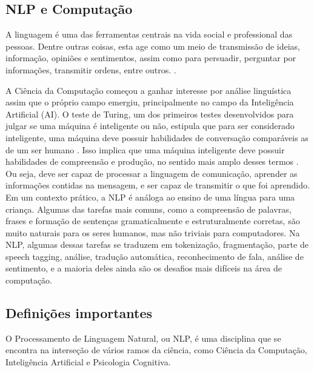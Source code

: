 \documentclass[
	12pt,				%
	openright,			%
	oneside,			%
	a4paper,			%
	english,			%
	spanish,			%
	brazil				%
	]{abntex2}
\begin{document}
		\subsection*{NLP e Computação}
		A linguagem é uma das ferramentas centrais na vida social e professional das pessoas. Dentre outras coisas, esta age como um meio de transmissão de ideias, informação, opiniões e sentimentos, assim como para persuadir, perguntar por informações, transmitir ordens, entre outros. \cite{book_natural_lang}.
		
A Ciência da Computação começou a ganhar interesse por análise linguística assim que o próprio campo emergiu, principalmente no campo da Inteligência Artificial (AI). O teste de Turing, um dos primeiros testes desenvolvidos para julgar se uma máquina é inteligente ou não, estipula que para ser considerado inteligente, uma máquina deve possuir habilidades de conversação comparáveis as de um ser humano \cite{turing}.  Isso implica que uma máquina inteligente deve possuir habilidades de compreensão e produção, no sentido mais amplo desses termos \cite{book_natural_lang}. Ou seja, deve ser capaz de processar a linguagem de comunicação, aprender as informações contidas na mensagem, e ser capaz de transmitir o que foi aprendido. 	
Em um contexto prático, a NLP é análoga ao ensino de uma língua para uma criança. Algumas das tarefas mais comuns, como a compreensão de palavras, frases e formação de sentenças gramaticalmente e estruturalmente corretas, são muito naturais para os seres humanos, mas não triviais para computadores. Na NLP, algumas dessas tarefas se traduzem em tokenização, fragmentação, parte de speech tagging, análise, tradução automática, reconhecimento de fala, análise de sentimento, e a maioria deles ainda são os desafios mais difíceis na área de computação\cite{book_natlang_python}.
		
	\subsection*{Definições importantes}
	O Processamento de Linguagem Natural, ou NLP, é uma disciplina que se encontra na interseção de vários ramos da ciência, como Ciência da Computação, Inteligência Artificial e Psicologia Cognitiva. 
	
\end{document}
